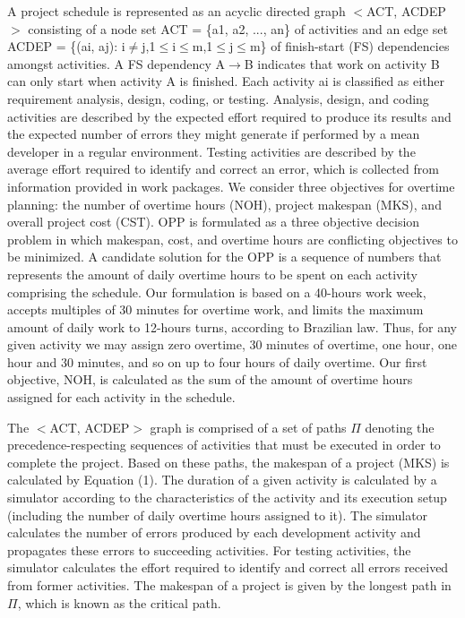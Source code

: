 \documentclass[conference]{IEEEtran}
\begin{document}
A project schedule is represented as an acyclic directed graph $<$ACT, ACDEP$>$ consisting of a node set ACT = \{a1, a2, ..., an\} of activities and an edge set ACDEP = \{(ai, aj): i$\not=$j,1$\leq$i$\leq$m,1$\leq$j$\leq$m\} of finish-start (FS) dependencies amongst activities. A FS dependency A$\rightarrow$B indicates that work on activity B can only start when activity A is finished. Each activity ai is classified as either requirement analysis, design, coding, or testing. Analysis, design, and coding activities are described by the expected effort required to produce its results and the expected number of errors they might generate if performed by a mean developer in a regular environment. Testing activities are described by the average effort required to identify and correct an error, which is collected from information provided in work packages.
We consider three objectives for overtime planning: the number of overtime hours (NOH), project makespan (MKS), and overall project cost (CST). OPP is formulated as a three objective decision problem in which makespan, cost, and overtime hours are conflicting objectives to be minimized. A candidate solution for the OPP is a sequence of numbers that represents the amount of daily overtime hours to be spent on each activity comprising the schedule. Our formulation is based on a 40-hours work week, accepts multiples of 30 minutes for overtime work, and limits the maximum amount of daily work to 12-hours turns, according to Brazilian law. Thus, for any given activity we may assign zero overtime, 30 minutes of overtime, one hour, one hour and 30 minutes, and so on up to four hours of daily overtime. Our first objective, NOH, is calculated as the sum of the amount of overtime hours assigned for each activity in the schedule.

The $<$ACT, ACDEP$>$ graph is comprised of a set of paths $\Pi$ denoting the precedence-respecting sequences of activities that must be executed in order to complete the project. Based on these paths, the makespan of a project (MKS) is calculated by Equation (1). The duration of a given activity is calculated by a simulator according to the characteristics of the activity and its execution setup (including the number of daily overtime hours assigned to it). The simulator calculates the number of errors produced by each development activity and propagates these errors to succeeding activities. For testing activities, the simulator calculates the effort required to identify and correct all errors received from former activities. The makespan of a project is given by the longest path in $\Pi$, which is known as the critical path.
\end{document}
